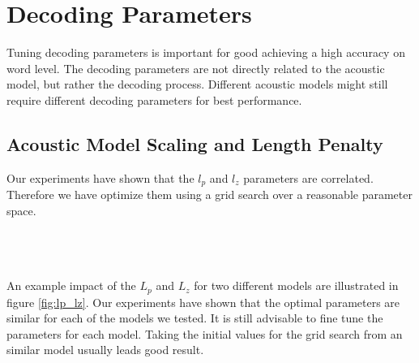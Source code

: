 \section{Decoding Parameters}
Tuning decoding parameters is important for good achieving a high accuracy on word level. The decoding parameters are not directly related to the acoustic model, but rather the decoding process. Different acoustic models might still require different decoding parameters for best performance. 
\subsection{Acoustic Model Scaling and Length Penalty}
Our experiments have shown that the $l_p$ and $l_z$ parameters are correlated. Therefore we have optimize them using a grid search over a reasonable parameter space. \\ \\
\begin{minipage}{\linewidth}
\begin{minipage}{0.5\linewidth}
\end{minipage}
\hfill
\begin{minipage}{0.5\linewidth}
\end{minipage}
\label{fig:lp_lz}
\end{minipage}
\\ \\
An example impact of the $L_p$ and $L_z$ for two different models are illustrated in figure \ref{fig:lp_lz}. Our experiments have shown that the optimal parameters are similar for each of the models we tested. It is still advisable to fine tune the parameters for each model. Taking the initial values for the grid search from an similar model usually leads good result.
